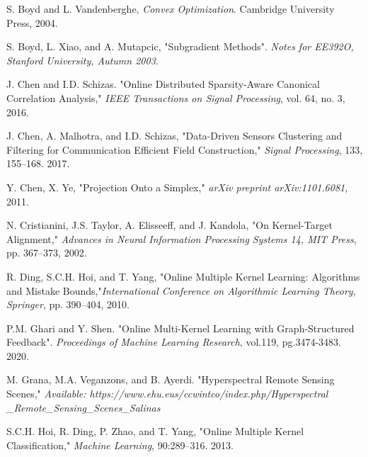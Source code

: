 \documentclass[10pt,final]{IEEEtran}
\begin{document}
\begin{thebibliography}{1}
S. Boyd and L. Vandenberghe, \emph{Convex Optimization}. Cambridge University Press, 2004.

S. Boyd, L. Xiao, and A. Mutapcic, "Subgradient Methods". \emph{Notes for EE392O, Stanford University, Autumn 2003}.



J. Chen and I.D. Schizas. "Online Distributed Sparsity-Aware Canonical Correlation Analysis," \emph{IEEE Transactions on Signal Processing}, vol. 64, no. 3, 2016.

J. Chen, A. Malhotra, and I.D. Schizas, "Data-Driven Sensors Clustering and Filtering for Communication Efficient Field Construction," \emph{Signal Processing}, 133, 155--168. 2017.

Y. Chen, X. Ye, "Projection Onto a Simplex," \emph{arXiv preprint arXiv:1101.6081}, 2011.

N. Cristianini, J.S. Taylor, A. Elisseeff, and J. Kandola, "On Kernel-Target Alignment," \emph{Advances in Neural Information Processing Systems 14, MIT Press}, pp. 367--373, 2002.

R. Ding, S.C.H. Hoi, and T. Yang, "Online Multiple Kernel Learning: Algorithms and Mistake Bounds,"{{\emph{International Conference on Algorithmic Learning Theory, Springer}, pp. 390--404, 2010.}}

P.M. Ghari and Y. Shen. "Online Multi-Kernel Learning with Graph-Structured Feedback". \emph{Proceedings of Machine Learning Research}, vol.119, pg.3474-3483. 2020.

M. Grana, M.A. Veganzons, and B. Ayerdi. "Hyperspectral Remote Sensing Scenes," \emph{Available: https://www.ehu.eus/ccwintco/index.php/Hyperspectral
\_Remote\_Sensing\_Scenes\_Salinas}

S.C.H. Hoi, R. Ding, P. Zhao, and T. Yang, "Online Multiple Kernel Classification," \emph{Machine Learning}, 90:289--316. 2013.


\end{thebibliography}
\end{document}
